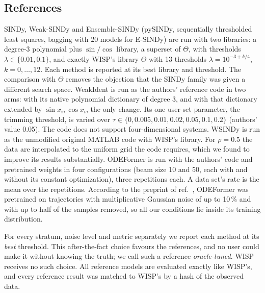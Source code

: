 \documentclass[10pt]{article}
\begin{document}
\subsection{References}
SINDy, Weak-SINDy and Ensemble-SINDy (pySINDy, sequentially thresholded least squares, bagging with 20 models for
E-SINDy) are run with two libraries: a degree-3 polynomial plus $\sin/\cos$ library, a superset of $\Theta$, with
thresholds $\lambda\in\{0.01,0.1\}$, and exactly WISP's library $\Theta$ with 13 thresholds
$\lambda=10^{-3+k/4}$, $k=0,\dots,12$. Each method is reported at its best library and threshold. The comparison
with $\Theta$ removes the objection that the SINDy family was given a different search space. WeakIdent \cite{tang2023} is run as the authors' reference code in two arms: with its native
polynomial dictionary of degree 3, and with that dictionary extended by $\sin x_i,\cos x_i$, the only change. Its one
user-set parameter, the trimming threshold, is varied over $\tau\in\{0,0.005,0.01,0.02,0.05,0.1,0.2\}$ (authors'
value 0.05). The code does not support four-dimensional systems. WSINDy is run as the unmodified original MATLAB code
\cite{messenger2021mms} with WISP's library. For $\rho=0.5$ the data are interpolated to the uniform grid the code
requires, which we found to improve its results substantially. ODEFormer \cite{dascoli2024} is run with the authors' code and
pretrained weights in four configurations (beam size 10 and 50, each with and without its constant optimization), three
repetitions each. A data set's rate is the mean over the repetitions. According to the preprint of
ref.~\cite{dascoli2023arxiv}, ODEFormer was pretrained on trajectories with multiplicative Gaussian noise of up to
10\,\% and with up to half of the samples removed, so all our conditions lie inside its training distribution.

For every stratum, noise level and metric separately we report each method at its \emph{best} threshold. This
after-the-fact choice favours the references, and no user could make it without knowing the truth; we call such a
reference \emph{oracle-tuned}. WISP receives no such choice. All reference models are evaluated exactly like WISP's, and every reference result was matched
to WISP's by a hash of the observed data.
\end{document}
